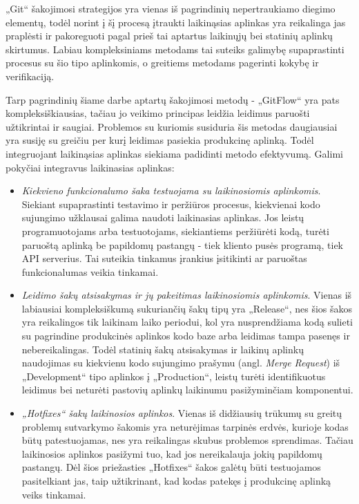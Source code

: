\documentclass{VUMIFPSkursinis}
\begin{document}
„Git“ šakojimosi strategijos yra vienas iš pagrindinių nepertraukiamo diegimo elementų, todėl norint į šį procesą įtraukti laikinąsias aplinkas yra reikalinga jas praplėsti ir pakoreguoti pagal prieš tai aptartus laikinųjų bei statinių aplinkų skirtumus. Labiau kompleksiniams metodams tai suteiks galimybę supaprastinti procesus su šio tipo aplinkomis, o greitiems metodams pagerinti kokybę ir verifikaciją. 

Tarp pagrindinių šiame darbe aptartų šakojimosi metodų - „GitFlow“ yra pats kompleksiškiausias, tačiau jo veikimo principas leidžia leidimus paruošti užtikrintai ir saugiai. Problemos su kuriomis susiduria šis metodas daugiausiai yra susiję su greičiu per kurį leidimas pasiekia produkcinę aplinką. Todėl integruojant laikinąsias aplinkas siekiama padidinti metodo efektyvumą. Galimi pokyčiai integravus laikinasias aplinkas: 

\begin{itemize}
  \item \textit{Kiekvieno funkcionalumo šaka testuojama su laikinosiomis aplinkomis}. Siekiant supaprastinti testavimo ir peržiūros procesus, kiekvienai kodo sujungimo užklausai galima naudoti laikinasias aplinkas. Jos leistų programuotojams arba testuotojams, siekiantiems peržiūrėti kodą, turėti paruoštą aplinką be papildomų pastangų - tiek kliento pusės programą, tiek API serverius. Tai suteikia tinkamus įrankius įsitikinti ar paruoštas funkcionalumas veikia tinkamai.

  \item \textit{Leidimo šakų atsisakymas ir jų pakeitimas laikinosiomis aplinkomis}. Vienas iš labiausiai kompleksiškumą sukuriančių šakų tipų yra „Release“, nes šios šakos yra reikalingos tik laikinam laiko periodui, kol yra nusprendžiama kodą sulieti su pagrindine produkcinės aplinkos kodo baze arba leidimas tampa pasenęs ir nebereikalingas. Todėl statinių šakų atsisakymas ir laikinų aplinkų naudojimas su kiekvienu kodo sujungimo prašymu (angl. \textit{Merge Request}) iš „Development“ tipo aplinkos į „Production“, leistų turėti identifikuotus leidimus bei neturėti pastovių aplinkų laikinumu pasižyminčiam komponentui.
  
  \item \textit{„Hotfixes“ šakų laikinosios aplinkos}. Vienas iš didžiausių trūkumų su greitų problemų sutvarkymo šakomis yra neturėjimas tarpinės erdvės, kurioje kodas būtų patestuojamas, nes yra reikalingas skubus problemos sprendimas. Tačiau laikinosios aplinkos pasižymi tuo, kad jos nereikalauja jokių papildomų pastangų. Dėl šios priežasties „Hotfixes“ šakos galėtų būti testuojamos pasitelkiant jas, taip užtikrinant, kad kodas patekęs į produkcinę aplinką veiks tinkamai.

\end{itemize}
\end{document}

